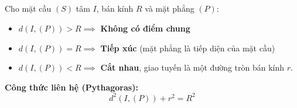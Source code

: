 \documentclass[12pt,a4paper]{extarticle}
\begin{document}
\subsection*{\color{myblue}{c) Vị trí tương đối giữa mặt phẳng và mặt cầu}}
\begin{tcolorbox}[colback=lightblue, colframe=myblue, arc=2mm]
Cho mặt cầu $(S)$ tâm $I$, bán kính $R$ và mặt phẳng $(P)$:
\begin{itemize}
    \item $d(I, (P)) > R \implies$ \textbf{Không có điểm chung}
    \item $d(I, (P)) = R \implies$ \textbf{Tiếp xúc} (mặt phẳng là tiếp diện của mặt cầu)
    \item $d(I, (P)) < R \implies$ \textbf{Cắt nhau}, giao tuyến là một đường tròn bán kính $r$.
\end{itemize}
\vspace{0.2cm}
\noindent \textbf{Công thức liên hệ (Pythagoras):}
\[
d^2(I, (P)) + r^2 = R^2
\]
\end{tcolorbox}
\vspace{0.3cm}
\end{document}
